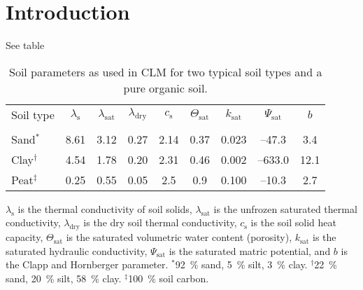 
\section{Introduction}


\lipsum[15] See table 



\begin{table}[h!tbc]
\caption{Soil parameters as used in CLM for two typical soil types and a pure organic soil. \label{tab:SoilParam}}
{
\centering
\begin{tabular}{l c c c c c c c c}
\toprule
Soil type & $\lambda_{\text{s}}$ & $\lambda_{\text{sat}}$ & $\lambda_{\text{dry}}$ & $c_{\text{s}}$ & $\Theta_{\text{sat}}$ & $k_{\text{sat}}$ & $\Psi_{\text{sat}}$ & $b$ \\
& \multicolumn{3}{c}{\capunit{\watt}} &\capunit{\giga\joule\per\meter\cubed\per\kelvin }&\capunit{-}&\capunit{\milli\meter\per\second}&\capunit{\milli\meter}&\capunit{-} \\
\midrule
Sand$^*$  & 8.61 & 3.12 & 0.27 & 2.14 & 0.37 & 0.023 & –47.3 & 3.4 \\
Clay$^\dag$ & 4.54 & 1.78 & 0.20 & 2.31 & 0.46 & 0.002 & –633.0 & 12.1 \\
Peat$^\ddag$ & 0.25 & 0.55 & 0.05 & 2.5 & 0.9 & 0.100 & –10.3 & 2.7 \\
\bottomrule
\end{tabular}

} %

\footnotesize{\vspace*{1ex}$\lambda_{\text{s}}$ is the thermal conductivity of soil solids, $\lambda_{\text{sat}}$ is the unfrozen saturated thermal conductivity, $\lambda_{\text{dry}}$ is the dry soil thermal conductivity, $c_{\text{s}}$ is the soil solid heat capacity, $\Theta_{\text{sat}}$ is the saturated volumetric water content (porosity), $k_{\text{sat}}$ is the saturated hydraulic conductivity, $\Psi_{\text{sat}}$ is the saturated matric potential, and $b$ is the Clapp and Hornberger parameter.
$^*$\SI{92}{\percent} sand, \SI{5}{\percent} silt, \SI{3}{\percent} clay. $^\dag$\SI{22}{\percent} sand, \SI{20}{\percent} silt, \SI{58}{\percent} clay. $^\ddag$\SI{100}{\percent} soil carbon.}

\end{table}


\lipsum[16]

